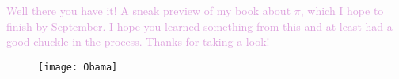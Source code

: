 \documentclass[11pt,titlepage]{article}
\begin{document}
\begin{comment}
There are around $3500$ digits pictured here, and there's actually a feature of $\pi$ that we can see in this illustration that we haven't been able to see yet. It's called the \textbf{Feynman Point}, named after the legendary physicist Richard Feynman. The ``point" is actually a sequence of six $9$s in the digits of $\pi$, which occur starting at the $762$nd spot. It's named after Feynman because he once said that he should memorize the digits of $\pi$ up to that spot, so he could recite them and cleverly finish with ``nine, nine, nine, nine, nine, nine, and so on." See if you can spot it on the spiral picture! First figure out which colour corresponds to the digit nine, then see if you can find six of them in a row. If you can't find them they're circled on the picture atop the next page. 


\begin{figure}
\centering
\texttt{[image: PiArt5]}
\end{figure}

But why should we limit ourselves to only $3500$ points in the spiral? By making the dots super tiny, there's no reason we can't include tens, or even hundreds of thousands of points. Here's what that looks like:

\begin{figure}[h]
\centering
\texttt{[image: PiArt6]}
\caption{Yeah, These Are Really Just Random Pictures Of Colours At This Point}
\end{figure}

The fact that the third of those, which is veering into over $100 000$ digits, looks like a pretty uniform blob, is another indication that $\pi$ is a truly random number. 
\end{comment}


{\Large \textcolor{Plum}{Well there you have it! A sneak preview of my book about $\pi$, which I hope to finish by September. I hope you learned something from this and at least had a good chuckle in the process. Thanks for taking a look!}} 
\vspace{2cm}
\begin{figure}[h]
\centering
\texttt{[image: Obama]}
\end{figure}
\end{document}
